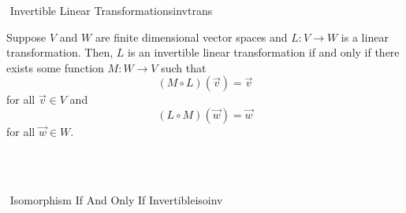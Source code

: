         \begin{definition}{\Stop\,\,Invertible Linear Transformations}{invtrans}

            Suppose \(V\) and \(W\) are finite dimensional vector spaces and \(L:V\to W\) is a linear transformation. Then, \(L\) is an invertible linear transformation if and only if there exists some function \(M:W\to V\) such that
            \begin{equation*}
                (M\circ L)(\vec{v})=\vec{v}
            \end{equation*}
            for all \(\vec{v}\in V\) and
            \begin{equation*}
                (L\circ M)(\vec{w})=\vec{w}
            \end{equation*}
            for all \(\vec{w}\in W\).
            
        \end{definition}
        \pagebreak
        \vphantom
        \\
        \\
        \begin{theorem}{\Stop\,\,Isomorphism If And Only If Invertible}{isoinv}
            \DOTHISLATER
        \end{theorem}
        \vphantom
        \\
        \\
        \DOTHISLATER
        